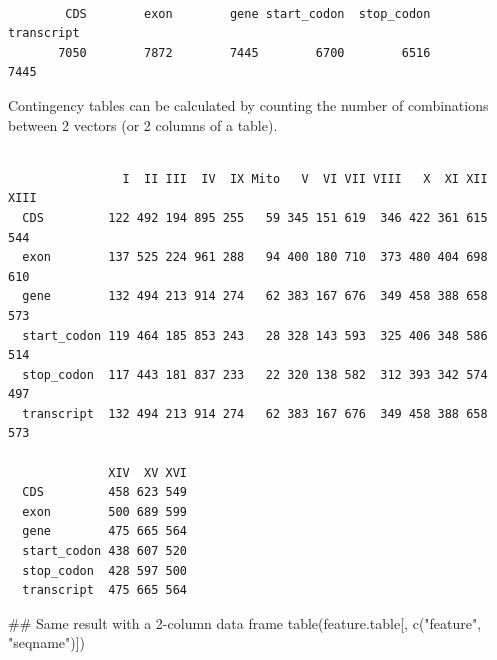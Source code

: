 \documentclass[]{article}
\newenvironment{Shaded}{\begin{snugshade}}{\end{snugshade}}
\newcommand{\KeywordTok}[1]{\textcolor[rgb]{0.94,0.87,0.69}{#1}}
\newcommand{\StringTok}[1]{\textcolor[rgb]{0.80,0.58,0.58}{#1}}
\newcommand{\OperatorTok}[1]{\textcolor[rgb]{0.94,0.94,0.82}{#1}}
\newcommand{\NormalTok}[1]{\textcolor[rgb]{0.80,0.80,0.80}{#1}}
\begin{document}
\begin{Shaded}
\end{Shaded}

\begin{verbatim}

        CDS        exon        gene start_codon  stop_codon  transcript 
       7050        7872        7445        6700        6516        7445 
\end{verbatim}

Contingency tables can be calculated by counting the number of
combinations between 2 vectors (or 2 columns of a table).

\begin{Shaded}
\end{Shaded}

\begin{verbatim}
             
                I  II III  IV  IX Mito   V  VI VII VIII   X  XI XII XIII
  CDS         122 492 194 895 255   59 345 151 619  346 422 361 615  544
  exon        137 525 224 961 288   94 400 180 710  373 480 404 698  610
  gene        132 494 213 914 274   62 383 167 676  349 458 388 658  573
  start_codon 119 464 185 853 243   28 328 143 593  325 406 348 586  514
  stop_codon  117 443 181 837 233   22 320 138 582  312 393 342 574  497
  transcript  132 494 213 914 274   62 383 167 676  349 458 388 658  573
             
              XIV  XV XVI
  CDS         458 623 549
  exon        500 689 599
  gene        475 665 564
  start_codon 438 607 520
  stop_codon  428 597 500
  transcript  475 665 564
\end{verbatim}

\begin{Shaded}
\begin{Highlighting}[]
\NormalTok{## Same result with a 2-column data frame}
\KeywordTok{table}\NormalTok{(feature.table[, }\KeywordTok{c}\NormalTok{(}\StringTok{"feature"}\NormalTok{, }\StringTok{"seqname"}\NormalTok{)])}
\end{Highlighting}
\end{Shaded}
\end{document}

